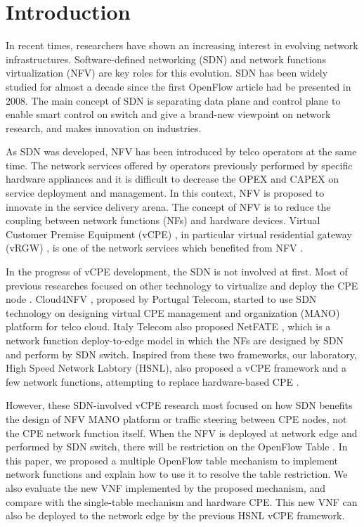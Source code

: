 \chapter{Introduction}
In recent times, researchers have shown an increasing interest in evolving network infrastructures. Software-defined networking (SDN) and network functions virtualization (NFV) are key roles for this evolution. SDN \cite{sdn-mckeown-2009-talk, sdn-newnorm, sdn-road, sdn-compre-survey} has been widely studied for almost a decade since the first OpenFlow \cite{openflow-mckeown-2008, openflow-spec} article had be presented in 2008. The main concept of SDN is separating data plane and control plane to enable smart control on switch and give a brand-new viewpoint on network research, and makes innovation on industries.

As SDN was developed, NFV \cite{nfv-wp, nfv-archi, nfv-survey} has been introduced by telco operators at the same time. The network services offered by operators previously performed by specific hardware appliances and it is difficult to decrease the OPEX and CAPEX on service deployment and management. In this context, NFV is proposed to innovate in the service delivery arena. The concept of NFV is to reduce the coupling between network functions (NFs) and hardware devices. Virtual Customer Premise Equipment (vCPE) \cite{vcpe-enhance}, in particular virtual residential gateway (vRGW) \cite{nfv-home}, is one of the network services which benefited from NFV \cite{nfv-usecase}.

In the progress of vCPE development, the SDN is not involved at first. Most of previous researches focused on other technology to virtualize and deploy the CPE node \cite{virtual-rg, security-vgw, design-vrgw, nfv-hgw-surrogate, linux-cpe, nfv-resoure-contrain-cpe}. Cloud4NFV \cite{cloud4nfv, cloud4nfv-telco}, proposed by Portugal Telecom, started to use SDN technology on designing virtual CPE management and organization (MANO) platform for telco cloud. Italy Telecom also proposed NetFATE \cite{netfate}, which is a network function deploy-to-edge model in which the NFs are designed by SDN and perform by SDN switch. Inspired from these two frameworks, our laboratory, High Speed Network Labtory (HSNL), also proposed a vCPE framework and a few network functions, attempting to replace hardware-based CPE \cite{che-wei-master, che-wei-umedia}.

However, these SDN-involved vCPE research most focused on how SDN benefits the design of NFV MANO platform or traffic steering between CPE nodes, not the CPE network function itself. When the NFV is deployed at network edge and performed by SDN switch, there will be restriction on the OpenFlow Table \cite{multiple-flow-table}. In this paper, we proposed a multiple OpenFlow table mechanism to implement network functions and explain how to use it to resolve the table restriction. We also evaluate the new VNF implemented by the proposed mechanism, and compare with the single-table mechanism and hardware CPE. This new VNF can also be deployed to the network edge by the previous HSNL vCPE framework.

